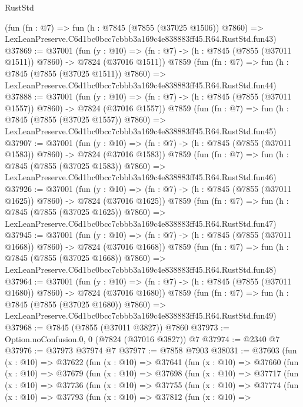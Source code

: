 \begin{lexlean}{RustStd}
\begin{coremodule}
    (fun (fn : @7) =>
    fun (h : @7845 (@7855 (@37025 @1506)) @7860) =>
    LexLeanPreserve.C6d1bc0bcc7cbbb3a169c4e838883ff45.R64.RustStd.fun43)
@37869 := @37001
    (fun (y : @10) => (fn : @7) -> (h : @7845 (@7855 (@37011 @1511)) @7860) -> @7824 (@37016 @1511))
    @7859
    (fun (fn : @7) =>
    fun (h : @7845 (@7855 (@37025 @1511)) @7860) =>
    LexLeanPreserve.C6d1bc0bcc7cbbb3a169c4e838883ff45.R64.RustStd.fun44)
@37888 := @37001
    (fun (y : @10) => (fn : @7) -> (h : @7845 (@7855 (@37011 @1557)) @7860) -> @7824 (@37016 @1557))
    @7859
    (fun (fn : @7) =>
    fun (h : @7845 (@7855 (@37025 @1557)) @7860) =>
    LexLeanPreserve.C6d1bc0bcc7cbbb3a169c4e838883ff45.R64.RustStd.fun45)
@37907 := @37001
    (fun (y : @10) => (fn : @7) -> (h : @7845 (@7855 (@37011 @1583)) @7860) -> @7824 (@37016 @1583))
    @7859
    (fun (fn : @7) =>
    fun (h : @7845 (@7855 (@37025 @1583)) @7860) =>
    LexLeanPreserve.C6d1bc0bcc7cbbb3a169c4e838883ff45.R64.RustStd.fun46)
@37926 := @37001
    (fun (y : @10) => (fn : @7) -> (h : @7845 (@7855 (@37011 @1625)) @7860) -> @7824 (@37016 @1625))
    @7859
    (fun (fn : @7) =>
    fun (h : @7845 (@7855 (@37025 @1625)) @7860) =>
    LexLeanPreserve.C6d1bc0bcc7cbbb3a169c4e838883ff45.R64.RustStd.fun47)
@37945 := @37001
    (fun (y : @10) => (fn : @7) -> (h : @7845 (@7855 (@37011 @1668)) @7860) -> @7824 (@37016 @1668))
    @7859
    (fun (fn : @7) =>
    fun (h : @7845 (@7855 (@37025 @1668)) @7860) =>
    LexLeanPreserve.C6d1bc0bcc7cbbb3a169c4e838883ff45.R64.RustStd.fun48)
@37964 := @37001
    (fun (y : @10) => (fn : @7) -> (h : @7845 (@7855 (@37011 @1680)) @7860) -> @7824 (@37016 @1680))
    @7859
    (fun (fn : @7) =>
    fun (h : @7845 (@7855 (@37025 @1680)) @7860) =>
    LexLeanPreserve.C6d1bc0bcc7cbbb3a169c4e838883ff45.R64.RustStd.fun49)
@37968 := @7845 (@7855 (@37011 @3827)) @7860
@37973 := Option.noConfusion.{0, 0} (@7824 (@37016 @3827)) @7
@37974 := @2340 @7
@37976 := @37973 @37974 @7
@37977 := @7858 @7903
@38031 := @37603
    (fun (x : @10) =>
    @37622
      (fun (x : @10) =>
      @37641
        (fun (x : @10) =>
        @37660
          (fun (x : @10) =>
          @37679
            (fun (x : @10) =>
            @37698
              (fun (x : @10) =>
              @37717
                (fun (x : @10) =>
                @37736
                  (fun (x : @10) =>
                  @37755
                    (fun (x : @10) =>
                    @37774
                      (fun (x : @10) =>
                      @37793
                        (fun (x : @10) =>
                        @37812
                          (fun (x : @10) =>

\end{coremodule}
\end{lexlean}
